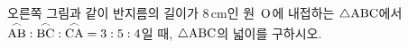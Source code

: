 \noindent\begin{minipage}[t]{0.58\linewidth}\vspace{0pt}\raggedright 오른쪽 그림과 같이 반지름의 길이가 $8\,\mathrm{cm}$인 원~$\mathrm{O}$에 내접하는 $\triangle\mathrm{ABC}$에서 $\overset{\frown}{\mathrm{AB}}:\overset{\frown}{\mathrm{BC}}:\overset{\frown}{\mathrm{CA}}=3:5:4$일 때, $\triangle\mathrm{ABC}$의 넓이를 구하시오.\end{minipage}\hfill\begin{minipage}[t]{0.4\linewidth}\vspace{0pt}\centering \resizebox{\ifdim\width>\linewidth\linewidth\else\width\fi}{!}{}\end{minipage}\par

